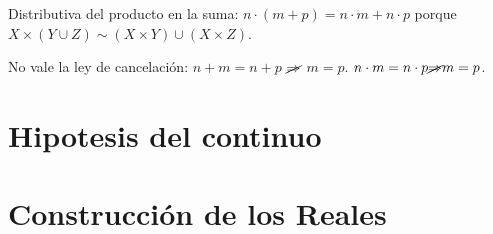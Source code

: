 \begin{prop}
    Distributiva del producto en la suma: $n \cdot (m+p) = n \cdot m + n \cdot p$ porque $X \times (Y \cup Z) \sim (X \times Y) \cup (X \times Z)$.
\end{prop}

\begin{note}
    No vale la ley de cancelación: $n+m=n+p$ $\cancel{\Rightarrow}$ $m=p$.
    $n \cdot m = n \cdot p \cancel{\Rightarrow} m=p$.
\end{note}

\section{Hipotesis del continuo}

\section{Construcción de los Reales}